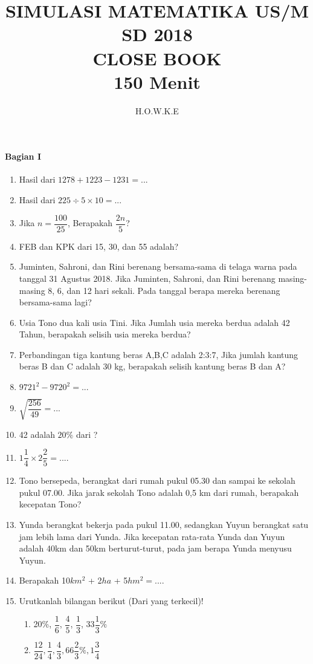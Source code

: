 \documentclass[12pt,a4paper,twocolumn]{article}
\author{H.O.W.K.E}
\title{SIMULASI MATEMATIKA US/M SD 2018\\ CLOSE BOOK\\ 150 Menit }
\begin{document}
	\maketitle
	\paragraph{Bagian I}
	\begin{enumerate}
		\item Hasil dari $1278+1223-1231=...$
		\item Hasil dari $225 \div 5 \times 10=...$
		\item Jika $n=\dfrac{100}{25}$, Berapakah $\dfrac{2n}{5}$?
		\item FEB dan KPK dari 15, 30, dan 55 adalah?
		\item Juminten, Sahroni, dan Rini berenang bersama-sama di telaga warna pada tanggal 31 Agustus 2018. Jika Juminten, Sahroni, dan Rini berenang masing-masing 8, 6, dan 12 hari sekali. Pada tanggal berapa mereka berenang bersama-sama lagi?
		\item Usia Tono dua kali usia Tini. Jika Jumlah usia mereka berdua adalah 42 Tahun, berapakah selisih usia mereka berdua?
		\item Perbandingan tiga kantung beras A,B,C adalah 2:3:7, Jika jumlah kantung beras B dan C adalah 30 kg, berapakah selisih kantung beras B dan A?
		\item $9721^2-9720^2=...$
		\item $\sqrt{\dfrac{256}{49}}=...$
		\item 42 adalah $20\%$ dari ?
		\item $1\dfrac{1}{4} \times 2\dfrac{2}{5}=.... $
		\item Tono bersepeda, berangkat dari rumah pukul 05.30 dan sampai ke sekolah pukul 07.00. Jika jarak sekolah Tono adalah 0,5 km dari rumah, berapakah kecepatan Tono?
		\item Yunda berangkat bekerja pada pukul 11.00, sedangkan Yuyun berangkat satu jam lebih lama dari Yunda. Jika kecepatan rata-rata Yunda dan Yuyun adalah 40km dan 50km berturut-turut, pada jam berapa Yunda menyusu Yuyun.
		\item Berapakah 10$km^2$ + 2$ ha$ + 5$hm^2=....$
		\item Urutkanlah bilangan berikut (Dari yang terkecil)!
			\begin{enumerate}
				\item 20\%, $\dfrac{1}{6}$, $\dfrac{4}{5}$, $\dfrac{1}{3}$, $33\dfrac{1}{3}\%$ 
				\item $\dfrac{12}{24}, \dfrac{1}{4}, \dfrac{4}{3}, 66\dfrac{2}{3}\%, 1\dfrac{3}{4}$

\end{enumerate}
\end{enumerate}
\end{document}
